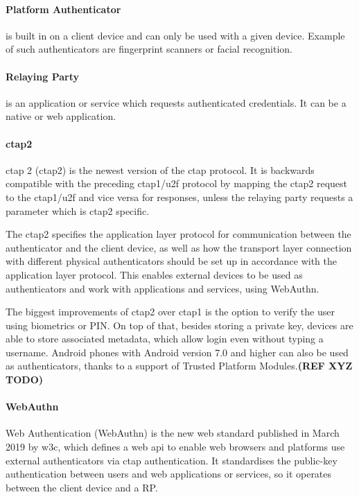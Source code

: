 \paragraph{Platform Authenticator} 
is built in on a client device and can only be used with a given device. Example of such authenticators are fingerprint scanners or facial recognition.

\paragraph{Relaying Party} 
is an application or service which requests authenticated credentials. It can be a native or web application.

\paragraph{\acrshort{ctap}2}
\acrlong{ctap} 2 (\acrshort{ctap}2) is the newest version of the \acrshort{ctap} protocol. It is backwards compatible with the preceding \acrshort{ctap}1/\acrshort{u2f} protocol by mapping the \acrshort{ctap}2 request to the \acrshort{ctap}1/\acrshort{u2f} and vice versa for responses, unless the relaying party requests a parameter which is \acrshort{ctap}2 specific. 

The \acrshort{ctap}2 specifies the application layer protocol for communication between the authenticator and the client device, as well as how the transport layer connection with different physical authenticators should be set up in accordance with the application layer protocol. This enables external devices to be used as authenticators and work with applications and services, using WebAuthn.

The biggest improvements of \acrshort{ctap}2 over \acrshort{ctap}1 is the option to verify the user using biometrics or PIN. On top of that, besides storing a private key, devices are able to store associated metadata, which allow login even without typing a username. Android phones with Android version 7.0 and higher can also be used as authenticators, thanks to a support of Trusted Platform Modules.\textbf{(REF XYZ TODO)}

\paragraph{WebAuthn} 
Web Authentication (WebAuthn) is the new web standard published in March 2019  by \acrshort{w3c}, which defines a web \acrshort{api} to enable web browsers and platforms use external authenticators via \acrshort{ctap} authentication. It standardises the public-key authentication between users and web applications or services, so it operates between the client device and a RP.

